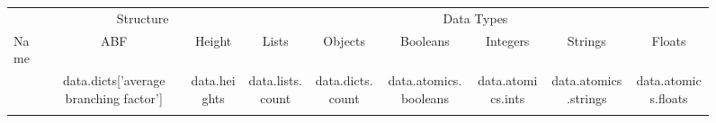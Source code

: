 \begin{figure*}
\begin{tabular}{ l | c c | c c c c c c |}
 & \multicolumn{2}{|c|}{Structure} & \multicolumn{6}{|c|}{Data Types} \\
Name & ABF & Height & Lists & Objects & Booleans & Integers & Strings & Floats \\\hline
{%
{%
{{ name }} & {{ data.dicts['average branching factor'] }} & {{ data.heights }} & {{data.lists.count}} & {{data.dicts.count}} & {{ data.atomics.booleans }} & {{ data.atomics.ints }} & {{data.atomics.strings}} & {{data.atomics.floats }}\\
{%
{%
\end{tabular}
\end{figure*}